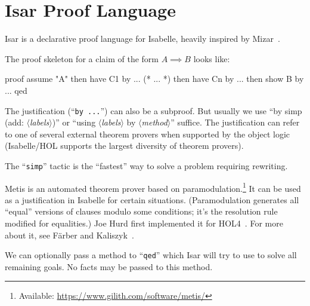 \section{Isar Proof Language}

\begin{node}\label{isabelle:isar-0000}%
Isar is a declarative proof language for Isabelle, heavily inspired by
Mizar~.
\end{node}

\begin{node}\label{isabelle:isar-0001}%
  The proof skeleton for a claim of the form $A\implies B$ looks like:
\begin{Isabelle}
proof
  assume "A"
  then have C1 by ...
  (* ... *)
  then have Cn by ...
  then show B by ...
qed
\end{Isabelle}

\begin{node}\label{isabelle:isar-0002}%
The justification (``\texttt{by ...}'') can also be a subproof. But
usually we use ``by simp (add: $\langle$\textit{labels\/}$\rangle$)'' or
``using $\langle$\textit{labels\/}$\rangle$ by $\langle$\textit{method\/}$\rangle$'' suffice. The
justification can refer to one of several external theorem provers when
supported by the object logic (Isabelle/HOL supports the largest
diversity of theorem provers).

\begin{node}\label{isabelle:isar-0004}%
The ``\texttt{simp}'' tactic is the ``fastest'' way to solve a problem
requiring rewriting.
\end{node}

\begin{node}[Metis]\label{isabelle:isar-0003}%
Metis%
is an automated theorem prover based on
paramodulation.\footnote{Available: \url{https://www.gilith.com/software/metis/}}
It can be used as a justification in Isabelle for certain
situations. (Paramodulation generates all ``equal'' versions of clauses
modulo some conditions; it's the resolution rule~
modified for equalities.)
Joe Hurd first implemented it for HOL4~\cite{hurd2003first}.
For more about it, see F{\"{a}}rber and Kaliszyk~\cite{farber2015metis}.
\end{node}
\end{node}

\begin{node}\label{isabelle:isar-0005}%
We can optionally pass a method to ``\texttt{qed}'' which Isar will try
to use to solve all remaining goals. No facts may be passed to this method.
\end{node}
\end{node}
